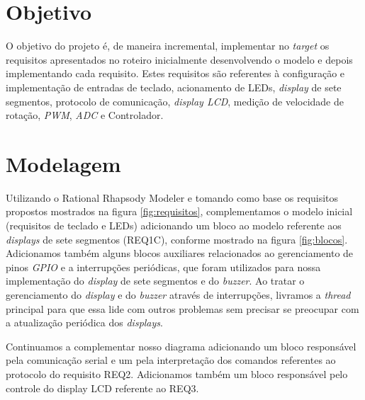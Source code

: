 \documentclass{article}
\begin{document}


\onehalfspacing
\section{Objetivo} 
O objetivo do projeto é, de maneira incremental, implementar no \textit{target} os requisitos apresentados no roteiro\cite{bb:roteiro} inicialmente desenvolvendo o modelo e depois implementando cada requisito. Estes requisitos são referentes à configuração e implementação de entradas de teclado, acionamento de LEDs, \textit{display} de sete segmentos, protocolo de comunicação, \textit{display LCD}, medição de velocidade de rotação, \textit{PWM}, \textit{ADC} e Controlador. 
	
\section{Modelagem}
Utilizando o Rational Rhapsody Modeler e tomando como base os requisitos propostos mostrados na figura \ref{fig:requisitos}, complementamos o modelo inicial\cite{bb:modelo} (requisitos de teclado e LEDs) adicionando um bloco ao modelo referente aos \textit{displays} de sete segmentos (REQ1C), conforme mostrado na figura \ref{fig:blocos}. Adicionamos também alguns blocos auxiliares relacionados ao gerenciamento de pinos \textit{GPIO} e a interrupções periódicas, que foram utilizados para nossa implementação do \textit{display} de sete segmentos e do \textit{buzzer}. Ao tratar o gerenciamento do \textit{display} e do \textit{buzzer} através de interrupções, livramos a \textit{thread} principal para que essa lide com outros problemas sem precisar se preocupar com a atualização periódica dos \textit{displays}.

Continuamos a complementar nosso diagrama adicionando um bloco responsável pela comunicação serial e um pela interpretação dos comandos referentes ao protocolo do requisito REQ2. Adicionamos também um bloco responsável pelo controle do display LCD referente ao REQ3.
\end{document}
